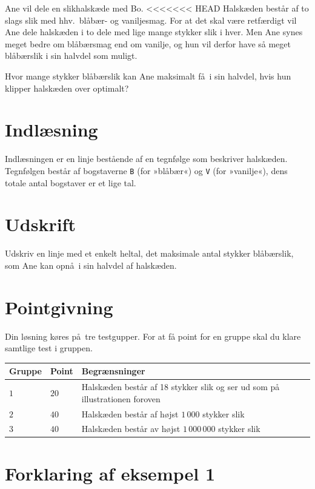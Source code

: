 
Ane vil dele en slikhalskæde med Bo.
<<<<<<< HEAD
Halskæden består af to slags slik med hhv.\ blåbær- og vaniljesmag.
For at det skal være retfærdigt vil Ane dele halskæden i to dele med lige mange stykker slik i hver.
Men Ane synes meget bedre om blåbærsmag end om vanilje, og hun vil derfor have så meget blåbærslik i sin halvdel som muligt.

Hvor mange stykker blåbærslik kan Ane maksimalt få i sin halvdel, hvis hun klipper halskæden over optimalt?

\section*{Indlæsning}

Indlæsningen er en linje bestående af en tegnfølge som beskriver halskæden.
Tegnfølgen består af bogstaverne \texttt{B} (for »blåbær«) og \texttt{V} (for »vanilje«), dens totale antal bogstaver er et lige tal.

\section*{Udskrift}
Udskriv en linje med et enkelt heltal, det maksimale antal stykker blåbærslik, som Ane kan opnå i sin halvdel af halskæden.

\section*{Pointgivning}

Din løsning køres på tre testgupper.
For at få point for en gruppe skal du klare samtlige test i gruppen.

\noindent
\begin{tabular}{ l  l  l }
Gruppe & Point & Begrænsninger \\ \hline
$1$   & $20$       & Halskæden består af 18 stykker slik og ser ud som på illustrationen foroven \\ 
$2$   & $40$       & Halskæden består af højst $1\,000$ stykker slik\\ 
$3$   & $40$       & Halskæden består av højst $1\,000\,000$ stykker slik
\end{tabular}

\section*{Forklaring af eksempel 1}

